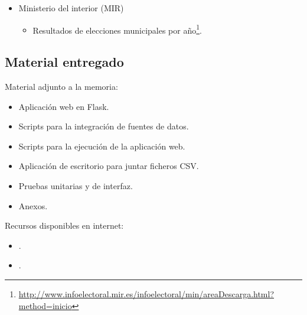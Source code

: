 \begin{itemize}
\begin{itemize}
		Relación de municipios y códigos por provincias\footnote{\href{http://www.ine.es/daco/daco42/codmun/codmunmapa.htm}{http://www.ine.es/daco/daco42/codmun/codmunmapa.htm}}.
	\end{itemize}
	\item
	Ministerio del interior (MIR)
	\begin{itemize}
		\item 
		Resultados de elecciones municipales por año\footnote{\href{http://www.infoelectoral.mir.es/infoelectoral/min/areaDescarga.html?method=inicio}{http://www.infoelectoral.mir.es/infoelectoral/min/areaDescarga.html?method=inicio}}.
	\end{itemize}
\end{itemize}

\newpage

\subsection{Material entregado}

Material adjunto a la memoria:

\begin{itemize}
	\item 
	Aplicación web en Flask.
	\item 
	Scripts para la integración de fuentes de datos.
	\item
	Scripts para la ejecución de la aplicación web.
	\item 
	Aplicación de escritorio para juntar ficheros CSV.
	\item 
	Pruebas unitarias y de interfaz.
	\item 
	Anexos.
\end{itemize}

Recursos disponibles en internet:

\begin{itemize}
	\item 
	.
	\item
	.
\end{itemize}
